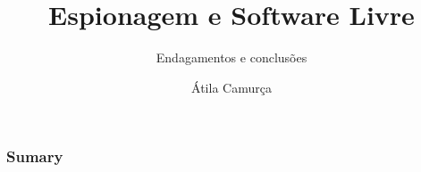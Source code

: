 \documentclass[10pt]{beamer}
\title{Espionagem e Software Livre}
\subtitle{Endagamentos e conclusões}
\author{Átila Camurça}
\begin{document}
\begin{frame}
\titlepage
\end{frame}

\begin{frame}\frametitle{Sumary}
\tableofcontents
\end{frame}


\end{document}
